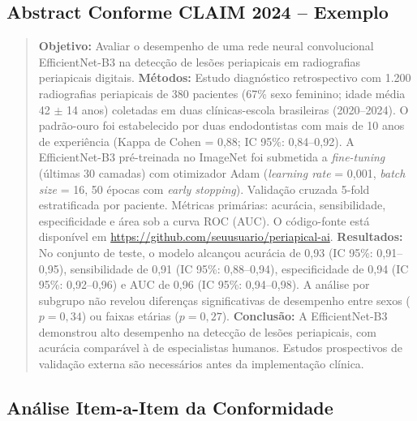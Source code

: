 \subsection{Abstract Conforme CLAIM 2024 -- Exemplo}

\begin{quote}
\textbf{Objetivo:} Avaliar o desempenho de uma rede neural convolucional
EfficientNet-B3 na detecção de lesões periapicais em radiografias periapicais
digitais. \textbf{Métodos:} Estudo diagnóstico retrospectivo com 1.200
radiografias periapicais de 380 pacientes (67\% sexo feminino; idade média 42
$\pm$ 14 anos) coletadas em duas clínicas-escola brasileiras (2020--2024). O
padrão-ouro foi estabelecido por duas endodontistas com mais de 10 anos de
experiência (Kappa de Cohen = 0,88; IC 95\%: 0,84--0,92). A EfficientNet-B3
pré-treinada no ImageNet foi submetida a \textit{fine-tuning} (últimas 30
camadas) com otimizador Adam (\textit{learning rate} = 0,001, \textit{batch
size} = 16, 50 épocas com \textit{early stopping}). Validação cruzada 5-fold
estratificada por paciente. Métricas primárias: acurácia, sensibilidade,
especificidade e área sob a curva ROC (AUC). O código-fonte está disponível em
\url{https://github.com/seuusuario/periapical-ai}. \textbf{Resultados:} No
conjunto de teste, o modelo alcançou acurácia de 0,93 (IC 95\%: 0,91--0,95),
sensibilidade de 0,91 (IC 95\%: 0,88--0,94), especificidade de 0,94 (IC 95\%:
0,92--0,96) e AUC de 0,96 (IC 95\%: 0,94--0,98). A análise por subgrupo não
revelou diferenças significativas de desempenho entre sexos ($p = 0,34$) ou
faixas etárias ($p = 0,27$). \textbf{Conclusão:} A EfficientNet-B3 demonstrou
alto desempenho na detecção de lesões periapicais, com acurácia comparável à de
especialistas humanos. Estudos prospectivos de validação externa são necessários
antes da implementação clínica.
\end{quote}


\subsection{Análise Item-a-Item da Conformidade}

